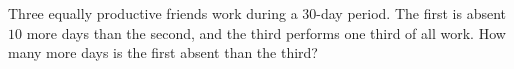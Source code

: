 Three equally productive friends work during a $30$-day period. The first is absent $10$ more days than the second, and the third performs one third of all work. How many more days is the first absent than the third?
